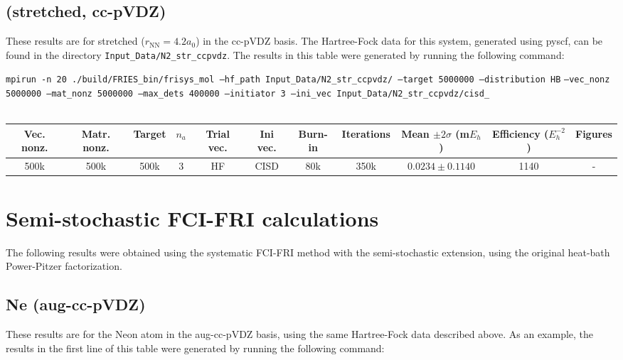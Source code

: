 \documentclass[12pt, landscape]{article}
\begin{document}
\subsection*{ (stretched, cc-pVDZ)}
These results are for stretched  ($r_\text{NN} = 4.2 a_0$) in the cc-pVDZ basis. The Hartree-Fock data for this system, generated using pyscf, can be found in the directory \texttt{Input\_Data/N2\_str\_ccpvdz}. The results in this table were generated by running the following command:

\texttt{mpirun -n 20 ./build/FRIES\_bin/frisys\_mol --hf\_path Input\_Data/N2\_str\_ccpvdz/ --target 5000000 --distribution HB} \texttt{--vec\_nonz 5000000 --mat\_nonz 5000000 --max\_dets 400000 --initiator 3 --ini\_vec Input\_Data/N2\_str\_ccpvdz/cisd\_}
\\~\\
\begin{tabular}{c|c|c|c|c|c|c|c|c|c|c}
Vec. nonz. & Matr. nonz. & Target & $n_a$ & Trial vec. & Ini vec. & Burn-in & Iterations & Mean $\pm 2 \sigma$ (m$E_h$) & Efficiency ($E_h^{-2}$) & Figures \\ \hline
500k & 500k & 500k & 3 & HF & CISD & 80k & 350k & $0.0234 \pm 0.1140$ & 1140 & - \\
\end{tabular}

\section*{Semi-stochastic FCI-FRI calculations}

The following results were obtained using the systematic FCI-FRI method with the semi-stochastic extension, using the original heat-bath Power-Pitzer factorization. 

\subsection*{Ne (aug-cc-pVDZ)}
These results are for the Neon atom in the aug-cc-pVDZ basis, using the same Hartree-Fock data described above. As an example, the results in the first line of this table were generated by running the following command:
\end{document}
